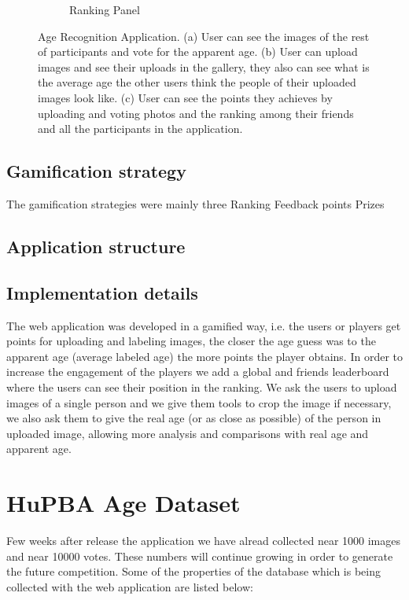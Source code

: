 \begin{figure}[!h]
\begin{subfigure}[b]{0.3\textwidth}
		\caption{Ranking Panel}
		\label{fig:ranking}
	\end{subfigure}
	\caption{Age Recognition Application. (a) User can see the images of the rest of participants and vote for the apparent age. (b) User can upload images and see their uploads in the gallery, they also can see what is the average age the other users think the people of their uploaded images look like. (c) User can see the points they achieves by uploading and voting photos and the ranking among their friends and all the participants in the application.}\label{fig:application}
\end{figure}

\subsection{Gamification strategy}
The gamification strategies were mainly three
Ranking
Feedback points
Prizes
\subsection{Application structure}

\subsection{Implementation details}

The web application was developed in a gamified way, i.e. the users or players get points for uploading and labeling images, the closer the age guess was to the apparent age (average labeled age) the more points the player obtains. In order to increase the engagement of the players we add a global and friends leaderboard where the users can see their position in the ranking. We ask the users to upload images of a single person and we give them tools to crop the image if necessary, we also ask them to give the real age (or as close as possible) of the person in uploaded image, allowing more analysis and
comparisons with real age and apparent age.

\section{HuPBA Age Dataset}

Few weeks after release the application we have alread collected near 1000 images and near 10000 votes. These numbers will continue growing in order to generate the future competition. Some of the properties of the database which is being collected with the web application are listed below:

